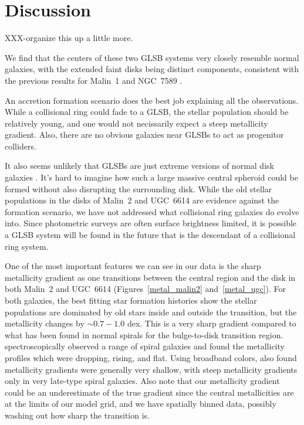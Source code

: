 \documentclass{emulateapj}
\begin{document}
\section{Discussion}

XXX-organize this up a little more.

We find that the centers of these two GLSB systems very closely resemble normal galaxies, with the extended faint disks being distinct components, consistent with the previous results for Malin~1 \citep{Barth07} and NGC~7589 \citep{Lelli10}. 

An accretion formation scenario does the best job explaining all the observations.  While a collisional ring could fade to a GLSB, the stellar population should be relatively young, and one would not necissarily expect a steep metallicity gradient.  Also, there are no obvious galaxies near GLSBs to act as progenitor colliders.  

It also seems unlikely that GLSBs are just extreme versions of normal disk galaxies \citep{Das13}.  It's hard to imagine how such a large massive central spheroid could be formed without also disrupting the surrounding disk.  While the old stellar populations in the disks of Malin~2 and UGC~6614 are evidence against the \citet{Mapelli08} formation scenario, we have not addressed what collisional ring galaxies do evolve into.  Since photometric surveys are often surface brightness limited, it is possible a GLSB system will be found in the future that is the descendant of a collisional ring system.  



One of the most important features we can see in our data is the sharp metallicity gradient as one transitions between the central region and the disk in both Malin~2 and UGC~6614 (Figures~\ref{metal_malin2} and~\ref{metal_ugc}).  For both galaxies, the best fitting star formation histories show the stellar populations are dominated by old stars inside and outside the transition, but the metallicity changes by $\sim0.7-1.0$ dex.  This is a very sharp gradient compared to what has been found in normal spirals for the bulge-to-disk transition region.  \citet{MacArthur09} spectroscopically observed a range of spiral galaxies and found the metallicity profiles which were dropping, rising, and flat.  Using broadband colors, \citet{MacArthur04} also found metallicity gradients were generally very shallow, with steep metallicity gradients only in very late-type spiral galaxies. Also note that our metallicity gradient could be an underestimate of the true gradient since the central metallicities are at the limits of our model grid, and we have spatially binned data, possibly washing out how sharp the transition is.
\end{document}
